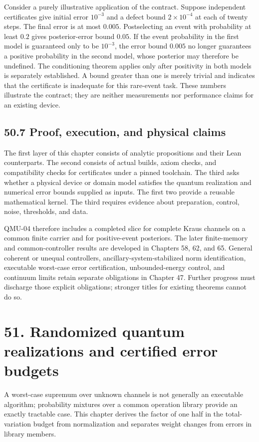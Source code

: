 \documentclass[
  11pt,
  oneside]{book}
\begin{document}
Consider a purely illustrative application of the contract. Suppose
independent certificates give initial error \(10^{-3}\) and a defect
bound \(2\times10^{-4}\) at each of twenty steps. The final error is at
most \(0.005\). Postselecting an event with probability at least \(0.2\)
gives posterior-error bound \(0.05\). If the event probability in the
first model is guaranteed only to be \(10^{-3}\), the error bound
\(0.005\) no longer guarantees a positive probability in the second
model, whose posterior may therefore be undefined. The conditioning
theorem applies only after positivity in both models is separately
established. A bound greater than one is merely trivial and indicates
that the certificate is inadequate for this rare-event task. These
numbers illustrate the contract; they are neither measurements nor
performance claims for an existing device.

\section{50.7 Proof, execution, and physical claims}

The first layer of this chapter consists of analytic propositions and
their Lean counterparts. The second consists of actual builds, axiom
checks, and compatibility checks for certificates under a pinned
toolchain. The third asks whether a physical device or domain model
satisfies the quantum realization and numerical error bounds supplied as
inputs. The first two provide a reusable mathematical kernel. The third
requires evidence about preparation, control, noise, thresholds, and
data.

QMU-04 therefore includes a completed slice for complete Kraus channels
on a common finite carrier and for positive-event posteriors. The later
finite-memory and common-controller results are developed in Chapters
58, 62, and 65. General coherent or unequal controllers,
ancillary-system-stabilized norm identification, executable worst-case
error certification, unbounded-energy control, and continuum limits
retain separate obligations in Chapter 47. Further progress must
discharge those explicit obligations; stronger titles for existing
theorems cannot do so.

\chapter{51. Randomized quantum realizations and certified error
budgets}\label{ch-51}

A worst-case supremum over unknown channels is not generally an
executable algorithm; probability mixtures over a common operation
library provide an exactly tractable case. This chapter derives the
factor of one half in the total-variation budget from normalization and
separates weight changes from errors in library members.
\end{document}
